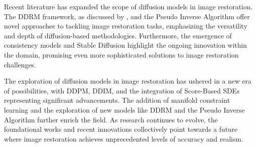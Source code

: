 \begin{survey}
Recent literature has expanded the scope of diffusion models in image restoration. The DDRM framework, as discussed by \cite{ddrm}, and the Pseudo Inverse Algorithm \cite{red_diff} offer novel approaches to tackling image restoration tasks, emphasizing the versatility and depth of diffusion-based methodologies. Furthermore, the emergence of consistency models \cite{Consistency} and Stable Diffusion  \cite{vae_model} highlight the ongoing innovation within the domain, promising even more sophisticated solutions to image restoration challenges.       


The exploration of diffusion models in image restoration has ushered in a new era of possibilities, with DDPM, DDIM, and the integration of Score-Based SDEs representing significant advancements. The addition of manifold constraint learning and the exploration of new models like DDRM and the Pseudo Inverse Algorithm further enrich the field. As research continues to evolve, the foundational works and recent innovations collectively point towards a future where image restoration achieves unprecedented levels of accuracy and realism.






\end{survey}
